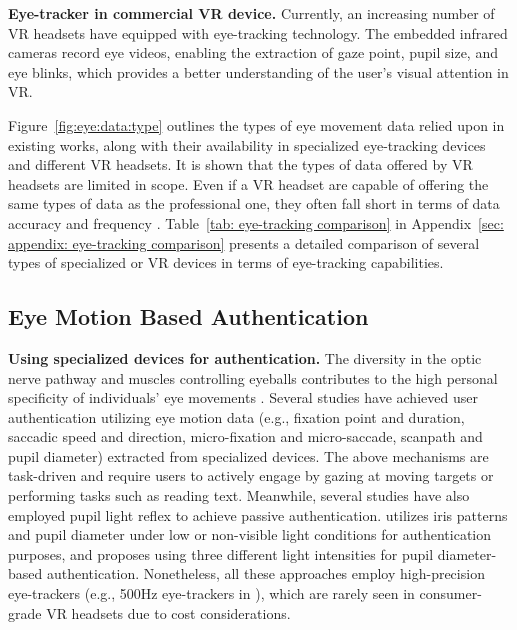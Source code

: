 \documentclass[sigconf]{acmart}
\begin{document}
\noindent \textbf{Eye-tracker in commercial VR device.} Currently, an increasing number of VR headsets have equipped with eye-tracking technology. The embedded infrared cameras record eye videos, enabling the extraction of gaze point, pupil size, and eye blinks, which provides a better understanding of the user's visual attention in VR. 

Figure~\ref{fig:eye:data:type} outlines the types of eye movement data relied upon in existing works, along with their availability in specialized eye-tracking devices and different VR headsets. It is shown that the types of data offered by VR headsets are limited in scope. Even if a VR headset are capable of offering the same types of data as the professional one, they often fall short in terms of data accuracy and frequency \cite{HTCWhitePaper,HTCValidation,Sipatchin2021,  MetaPreliminary, AppleValidation}.
Table~\ref{tab: eye-tracking comparison} in Appendix~\ref{sec: appendix: eye-tracking comparison} presents a detailed comparison of several types of specialized or VR devices in terms of eye-tracking capabilities.

\subsection{Eye Motion Based Authentication}
\noindent \textbf{Using specialized devices for authentication.} The diversity in the optic nerve pathway and muscles controlling eyeballs contributes to the high personal specificity of individuals' eye movements \cite{Castelhano, Lo2016IndividualDI}. 
Several studies \cite{IGCB_Reading, ICB_Reading, ReflexiveEM_CCS16, Eberz2015PreventingLA, IeeeTO, Eberz2016LooksLE, 28Blinks_CCS19} have achieved user authentication utilizing eye motion data (e.g., fixation point and duration, saccadic speed and direction, micro-fixation and micro-saccade, scanpath and pupil diameter) extracted from specialized devices. The above mechanisms are task-driven and require users to actively engage by gazing at moving targets or performing tasks such as reading text. Meanwhile, several studies have also employed pupil light reflex to achieve passive authentication. \cite{YANO201541} utilizes iris patterns and pupil diameter under low or non-visible light conditions for authentication purposes, and \cite{Yan2020} proposes using three different light intensities for pupil diameter-based authentication. Nonetheless, all these approaches employ high-precision eye-trackers (e.g., 500Hz eye-trackers in \cite{ReflexiveEM_CCS16}), which are rarely seen in consumer-grade VR headsets due to cost considerations.
\end{document}
